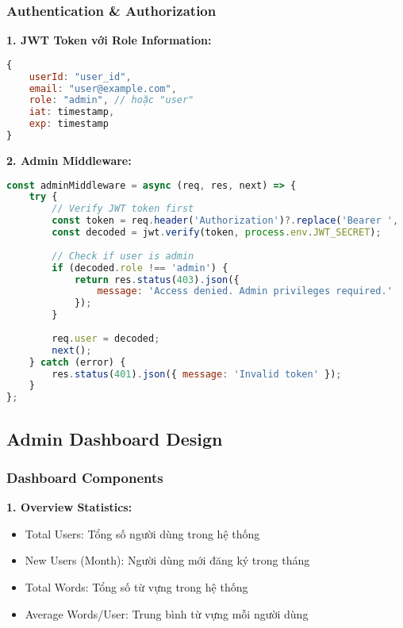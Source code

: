 \documentclass[12pt,a4paper]{article}
\begin{document}
\subsubsection{Authentication \& Authorization}

\textbf{1. JWT Token với Role Information:}
\begin{lstlisting}[language=JavaScript, caption=JWT Payload với Role]
{
    userId: "user_id",
    email: "user@example.com", 
    role: "admin", // hoặc "user"
    iat: timestamp,
    exp: timestamp
}
\end{lstlisting}

\textbf{2. Admin Middleware:}
\begin{lstlisting}[language=JavaScript, caption=Admin Authorization Middleware]
const adminMiddleware = async (req, res, next) => {
    try {
        // Verify JWT token first
        const token = req.header('Authorization')?.replace('Bearer ', '');
        const decoded = jwt.verify(token, process.env.JWT_SECRET);
        
        // Check if user is admin
        if (decoded.role !== 'admin') {
            return res.status(403).json({
                message: 'Access denied. Admin privileges required.'
            });
        }
        
        req.user = decoded;
        next();
    } catch (error) {
        res.status(401).json({ message: 'Invalid token' });
    }
};
\end{lstlisting}

\subsection{Admin Dashboard Design}

\subsubsection{Dashboard Components}

\textbf{1. Overview Statistics:}
\begin{itemize}
    \item Total Users: Tổng số người dùng trong hệ thống
    \item New Users (Month): Người dùng mới đăng ký trong tháng
    \item Total Words: Tổng số từ vựng trong hệ thống
    \item Average Words/User: Trung bình từ vựng mỗi người dùng
\end{itemize}
\end{document}
